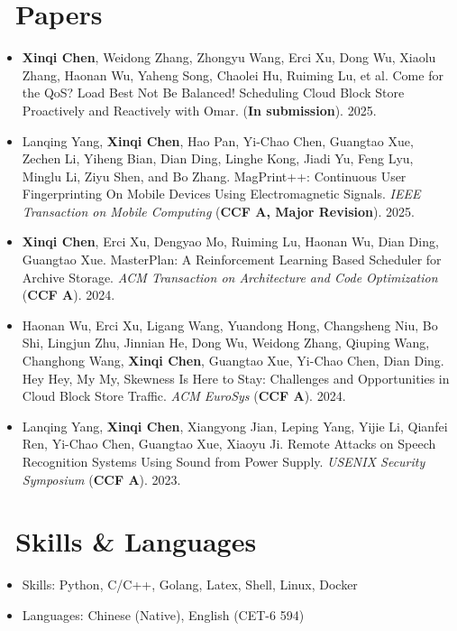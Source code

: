\documentclass{resume}
\begin{document}
\section{\faFileTextO \ Papers}
\begin{itemize}[parsep=0.5ex]
  \item \textbf{Xinqi Chen}, Weidong Zhang, Zhongyu Wang, Erci Xu, Dong Wu, Xiaolu Zhang, Haonan Wu, Yaheng Song, Chaolei Hu, Ruiming Lu, et al. Come for the QoS? Load Best Not Be Balanced! Scheduling Cloud Block Store Proactively and Reactively with
  Omar. (\textbf{In submission}). 2025.
  \item Lanqing Yang, \textbf{Xinqi Chen}, Hao Pan, Yi-Chao Chen, Guangtao Xue, Zechen Li, Yiheng Bian,
  Dian Ding, Linghe Kong, Jiadi Yu, Feng Lyu, Minglu Li, Ziyu Shen, and Bo Zhang. MagPrint++: Continuous User Fingerprinting On
  Mobile Devices Using Electromagnetic Signals. \textit{IEEE Transaction on Mobile Computing} (\textbf{CCF A, Major Revision}). 2025.
  \item \textbf{Xinqi Chen}, Erci Xu, Dengyao Mo, Ruiming Lu, Haonan Wu, Dian Ding, Guangtao Xue. MasterPlan: A Reinforcement Learning Based Scheduler for Archive Storage. \textit{ACM Transaction on Architecture and Code Optimization} (\textbf{CCF A}). 2024.
  \item Haonan Wu, Erci Xu, Ligang Wang, Yuandong Hong, Changsheng Niu, Bo Shi, Lingjun Zhu, Jinnian He, Dong Wu, Weidong Zhang, Qiuping Wang, Changhong Wang, \textbf{Xinqi Chen}, Guangtao Xue, Yi-Chao Chen, Dian Ding. Hey Hey, My My, Skewness Is Here to Stay: Challenges and Opportunities in Cloud Block Store Traffic. \textit{ACM EuroSys} (\textbf{CCF A}). 2024.
  \item Lanqing Yang, \textbf{Xinqi Chen}, Xiangyong Jian, Leping Yang, Yijie Li, Qianfei Ren, Yi-Chao Chen, Guangtao Xue, Xiaoyu Ji. Remote Attacks on Speech Recognition Systems Using Sound from Power Supply. \textit{USENIX Security Symposium} (\textbf{CCF A}). 2023.
\end{itemize}

\section{\faCogs\ Skills \& Languages}
\begin{itemize}[parsep=0.5ex]
  \item Skills: Python, C/C++, Golang, Latex, Shell, Linux, Docker
  \item Languages: Chinese (Native), English (CET-6 594)
\end{itemize}
\end{document}
